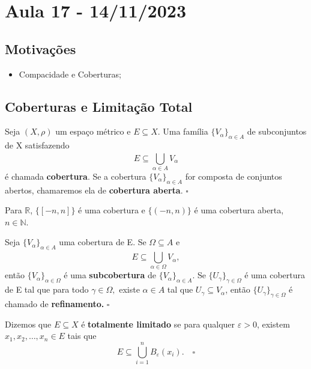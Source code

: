 \documentclass[MetricSpaces/metric_notes.tex]{subfiles}
\begin{document}
\section{Aula 17 - 14/11/2023}
\subsection{Motivações}
\begin{itemize}
	\item Compacidade e Coberturas;
\end{itemize}
\subsection{Coberturas e Limitação Total}
\begin{def*}
	Seja \((X, \rho )\) um espaço métrico e \(E\subseteq{X}.\) Uma família \(\{V_{\alpha }\}_{\alpha \in A}\) de subconjuntos de X satisfazendo
	\[
		E \subseteq \bigcup_{\alpha \in A}^{}{V_{\alpha }}
	\]
	é chamada \textbf{cobertura}. Se a cobertura \(\{V_{\alpha }\}_{\alpha \in A}\) for composta de conjuntos abertos, chamaremos ela de \textbf{cobertura aberta}. \(\square\)
\end{def*}
\begin{example}
	Para \(\mathbb{R}\), \(\{[-n, n]\}\) é uma cobertura e \(\{(-n, n)\}\) é uma cobertura aberta, \(n\in \mathbb{N}\).
\end{example}
\begin{def*}
	Seja \(\{V_{\alpha }\}_{\alpha \in A}\) uma cobertura de E. Se \(\Omega \subseteq{A}\) e
	\[
		E \subseteq{\bigcup_{\alpha \in \Omega }^{}{V_{\alpha }}},
	\]
	então \(\{V_{\alpha }\}_{\alpha \in \Omega }\) é uma \textbf{subcobertura} de \(\{V_{\alpha }\}_{\alpha \in A}.\) Se \(\{U_{\gamma }\}_{\gamma \in \Omega }\) é uma cobertura
	de E tal que para todo \(\gamma \in \Omega, \) existe \(\alpha \in A\) tal que \(U_{\gamma }\subseteq{V_{\alpha }}\), então \(\{U_{\gamma }\}_{\gamma \in\Omega }\)
	é chamado de \textbf{refinamento.} \(\square\)
\end{def*}
\begin{def*}
	Dizemos que \(E\subseteq{X}\) é \textbf{totalmente limitado} se para qualquer \(\varepsilon > 0\), existem \(x_{1}, x_{2}, \dotsc, x_{n}\in E\) tais que
	\[
		E \subseteq{\bigcup_{i=1}^{n}{B_{\varepsilon }(x_{i})}}.\quad\square
	\]
\end{def*}
\end{document}
